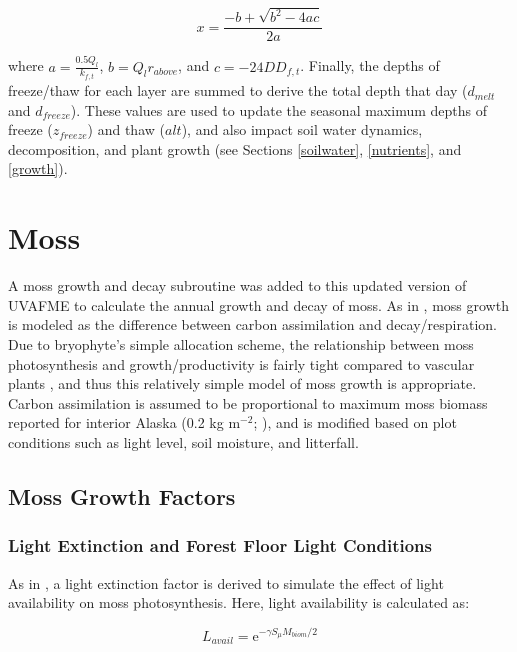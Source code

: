 \documentclass[a4paper, 12pt] {report}
\begin{document}
\begin{equation}
x = \frac{-b + \sqrt{b^2 - 4ac}}{2a}
\end{equation}

where $a = \frac{0.5Q_l}{k_{f,t}}$, $b = Q_lr_{above}$, and $c = -24DD_{f,t}$. Finally, the depths of freeze/thaw for each layer are summed to derive the total depth that day ($d_{melt}$ and $d_{freeze}$). These values are used to update the seasonal maximum depths of freeze ($z_{freeze}$) and thaw ($alt$), and also impact soil water dynamics, decomposition, and plant growth (see Sections \ref{soilwater}, \ref{nutrients}, and \ref{growth}).

\section{Moss} \label{moss}

A moss growth and decay subroutine was added to this updated version of UVAFME to calculate the annual growth and decay of moss. As in , moss growth is modeled as the difference between carbon assimilation and decay/respiration. Due to bryophyte's simple allocation scheme, the relationship between moss photosynthesis and growth/productivity is fairly tight compared to vascular plants \cite{oechelRoleBryophytesNutrient1986}, and thus this relatively simple model of moss growth is appropriate. Carbon assimilation is assumed to be proportional to maximum moss biomass reported for interior Alaska (0.2 kg m$^{-2}$; ), and is modified based on plot conditions such as light level, soil moisture, and litterfall.

\subsection{Moss Growth Factors}

\subsubsection{Light Extinction and Forest Floor Light Conditions}

As in , a light extinction factor is derived to simulate the effect of light availability on moss photosynthesis. Here, light availability is calculated as:

\begin{equation}
L_{avail} = \text{e}^{-\gamma S_\mu M_{biom}/2}
\end{equation}
\end{document}
